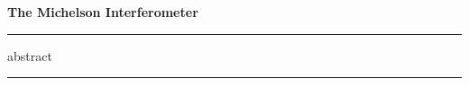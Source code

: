 

\par
\begin{center}
{\Large\textbf{The Michelson Interferometer}}


    
\par\noindent\rule{\textwidth}{0.4pt}

   abstract
    
    
    \par\noindent\rule{\textwidth}{0.4pt}
\end{center}

